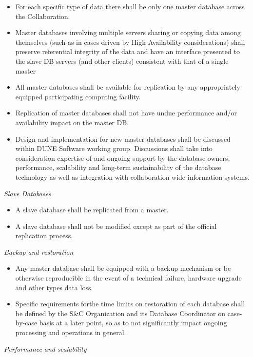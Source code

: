 \begin{itemize}
\item For each specific type of data there shall be only one master database across the Collaboration.

\item Master databases involving multiple servers sharing or copying data among themselves (such as in cases driven by High Availability considerations) shall preserve referential integrity of the data and  have an interface presented to the slave DB servers (and other clients) consistent with that of a single master

\item All master databases shall be available for replication by any appropriately equipped participating computing facility.

\item Replication of master databases shall not have undue performance and/or availability impact on the master DB.

\item Design and implementation for new master databases shall be discussed within DUNE Software working group.  Discussions shall take into
consideration expertise of and ongoing support by the database owners, performance, scalability and long-term sustainability of the database
technology as well as integration with collaboration-wide information systems.
\end{itemize}
\noindent
\textit{Slave Databases}
\begin{itemize}
\item A slave database shall be replicated from a master.

\item A slave database shall not be modified except as part of the official replication process.
\end{itemize}
\noindent
\textit{Backup and restoration}

\begin{itemize}
\item Any master database shall be equipped with a backup mechanism or be otherwise reproducible in the event of a technical failure, 
hardware upgrade and other types data loss.
\item Specific requirements forthe time limits on restoration of each database shall be defined by the S\&C Organization 
and its Database Coordinator on case-by-case basis at a later point, so as to not significantly impact ongoing processing and operations in general.
\end{itemize}
\noindent
\textit{Performance and scalability}

